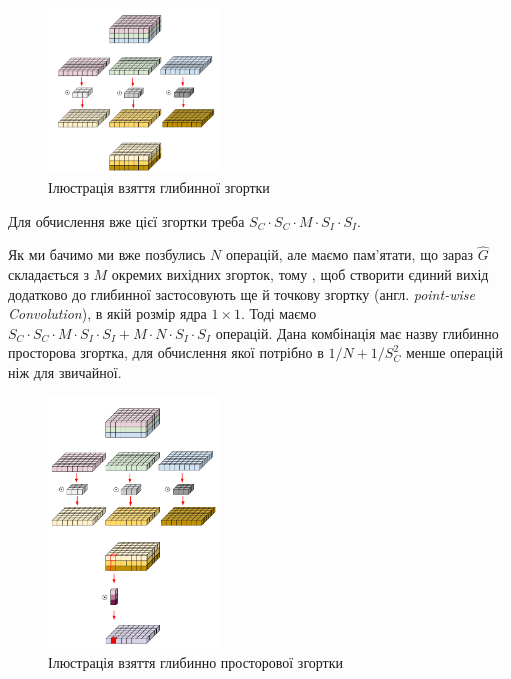 \begin{figure}[H]
    \centering
    \includegraphics[width=0.4\textwidth]{images/cnn_deep_wise_conv}
    \caption{Ілюстрація взяття глибинної згортки  \cite{deep_wise_sep_conv_website}
        \label{fig:cnn:deep_wise_conv}
    }
\end{figure}

Для обчислення вже цієї згортки треба  $S_C · S_C · M · S_I · S_I$.

Як ми бачимо ми вже позбулись $N$ операцій, але маємо пам'ятати, що
зараз $\widehat{G}$ складається з $M$ окремих вихідних згорток, тому
, щоб створити єдиний вихід додатково до глибинної застосовують ще
й точкову згортку (англ. \textit{point-wise Convolution}), в якій розмір
ядра $1 \times 1$. Тоді маємо
$S_C · S_C · M · S_I · S_I + M · N · S_I · S_I$ операцій.
Дана комбінація має назву глибинно просторова згортка, для
обчислення якої потрібно в $1/N + 1/S_C^2$ менше операцій ніж
для звичайної.

\begin{figure}[H]
    \centering
    \includegraphics[width=0.4\textwidth]{images/cnn_deep_wise_separable_conv}
    \caption{Ілюстрація взяття глибинно просторової згортки  \cite{deep_wise_sep_conv_website}
        \label{fig:cnn:deep_wise_sep_conv}
    }
\end{figure}



